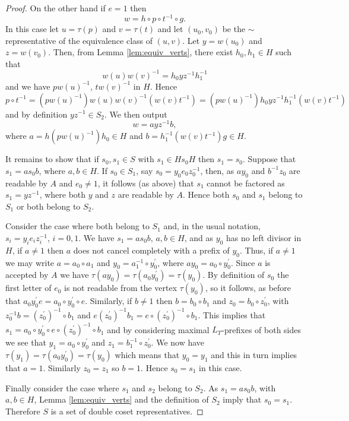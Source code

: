 \documentclass[a4paper,12pt]{article}
\renewcommand{\t}{\tau }
\numberwithin{equation}{section}
\numberwithin{figure}{section}
\begin{document}
\begin{proof}
On the other hand if $e=1$ then 
\[w=h\circ p\circ t^{-1}\circ g.\]
In this case let $u=\t(p)$ and $v=\t(t)$ and let $(u_0,v_0)$ be the $\sim$ representative
of the equivalence class of $(u,v)$.  Let $y=w(u_0)$ and $z=w(v_0)$. Then,  from Lemma
\ref{lem:equiv_verts}, there exist $h_0,h_1\in H$ such that 
\[w(u)w(v)^{-1}=h_0yz^{-1}h_1^{-1}\]
and we have $p w(u)^{-1}$, $t w(v)^{-1}$ in $H$. Hence 
\[
p\circ t^{-1}=( p w(u)^{-1})w(u)w(v)^{-1}( w(v)t^{-1})=( p w(u)^{-1}) h_0 yz^{-1}
h_1^{-1}( w(v)t^{-1})
\]
and by definition $yz^{-1}\in S_2$. We then output 
\[w=a yz^{-1} b,\]
where $a=h ( p w(u)^{-1}) h_0\in H$ and $b=h_1^{-1}( w(v)t^{-1})g \in H$.

It remains to show that if $s_0,s_1\in S$ with $s_1\in Hs_0H$ then $s_1=s_0$.
Suppose that $s_1=as_0b$, where $a, b\in H$.  
If $s_0\in S_1$, say $s_0=y_0e_0z_0^{-1}$, then, as $ay_0$ and $b^{-1}z_0$ are readable
by $A$ and $e_0\neq 1$, it follows (as above) that $s_1$  
cannot be factored as $s_1=yz^{-1}$,
where both $y$ and $z$ are readable by $A$. Hence both $s_0$ and $s_1$ belong to
$S_1$ or both belong to $S_2$. 

Consider the case where both belong to $S_1$ and, in the usual notation,
$s_i=y_i e_i z_i^{-1}$, $i=0,1$. We have $s_1=as_0b$, $a,b\in H$, and as $y_0$ has
no left divisor in $H$, if $a\neq 1$ then $a$ does not cancel completely with
 a prefix of $y_0$. Thus, if $a\neq 1$ we may write $a=a_0\circ a_1$ and 
$y_0=a_1^{-1}\circ y_0^\prime$, where $ay_0=a_0\circ y_0^\prime$. Since 
$a$ is accepted by $A$ we have $\t(ay_0)=\t(a_0y_0^\prime)=\t(y_0)$. By definition
of $s_0$ the first letter of $e_0$ is not readable from the vertex $\t(y_0)$, so
it follows, as before that $a_0y_0^\prime e=a_0\circ y_0^\prime \circ e$. Similarly,
if $b\neq 1$ then $b=b_0\circ b_1$ and $z_0=b_0\circ z_0^\prime$, with
$z_0^{-1}b= (z_0^\prime)^{-1}\circ b_1$ and $e (z_0^\prime)^{-1}b_1=
e\circ  (z_0^\prime)^{-1}\circ b_1$. This implies that 
$s_1=a_0\circ y_0^\prime \circ  e\circ  (z_0^\prime)^{-1}\circ b_1$ and by considering 
maximal $L_T$-prefixes of both sides we see that $y_1=a_0\circ y_0^\prime$ and 
$z_1=b_1^{-1}\circ z_0^\prime$. We now have  $\t(y_1)=\t(a_0y_0^\prime)=\t(y_0)$ which
 means that 
$y_0=y_1$ and this in turn implies that $a=1$. Similarly $z_0=z_1$ so $b=1$. 
Hence $s_0=s_1$ in this case.

Finally consider the case where $s_1$ and $s_2$ belong to $S_2$. As $s_1=as_0b$, with
$a,b\in H$, Lemma \ref{lem:equiv_verts} and the definition of $S_2$ imply  that 
$s_0= s_1$. Therefore $S$ is a set of double coset representatives.
\end{proof}
\end{document}
